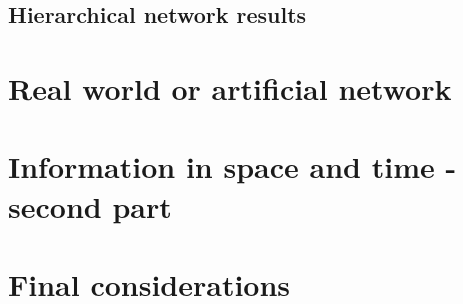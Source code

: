 \subsection{Hierarchical network results}

\section{Real world or artificial network}
\label{sec:confrontation}

\section{Information in space and time - second part}
\label{sec:spacetime2}

\section{Final considerations}
\label{sec:final}